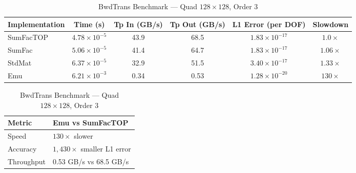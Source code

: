\documentclass[11pt]{article}
\begin{document}
\begin{table}[htbp]
\centering
\caption{BwdTrans Benchmark --- Quad $128 \times 128$, Order 3}
\label{tab:bwdtrans-benchmark}
\renewcommand{\arraystretch}{1.3}
\footnotesize
\begin{tabular}{l c c c c c}
\toprule
\textbf{Implementation} & \textbf{Time (s)} & \textbf{Tp In (GB/s)} & \textbf{Tp Out (GB/s)} & \textbf{L1 Error (per DOF)} & \textbf{Slowdown} \\
\midrule
SumFacTOP & $4.78 \times 10^{-5}$ & 43.9 & 68.5 & $1.83 \times 10^{-17}$ & $1.0\times$ \\
SumFac    & $5.06 \times 10^{-5}$ & 41.4 & 64.7 & $1.83 \times 10^{-17}$ & $1.06\times$ \\
StdMat    & $6.37 \times 10^{-5}$ & 32.9 & 51.5 & $3.40 \times 10^{-17}$ & $1.33\times$ \\
\midrule
Emu       & $6.21 \times 10^{-3}$ & 0.34 & 0.53 & $1.28 \times 10^{-20}$ & $130\times$ \\
\bottomrule
\end{tabular}

\vspace{1.5em}

\centering
{}
\label{tab:key-ratios}
\renewcommand{\arraystretch}{1.3}
\begin{tabular}{l l}
\toprule
\textbf{Metric} & \textbf{Emu vs SumFacTOP} \\
\midrule
Speed      & $130\times$ slower \\
Accuracy   & $1{,}430\times$ smaller L1 error \\
Throughput & 0.53 GB/s vs 68.5 GB/s \\
\bottomrule
\end{tabular}
\end{table}
\end{document}
